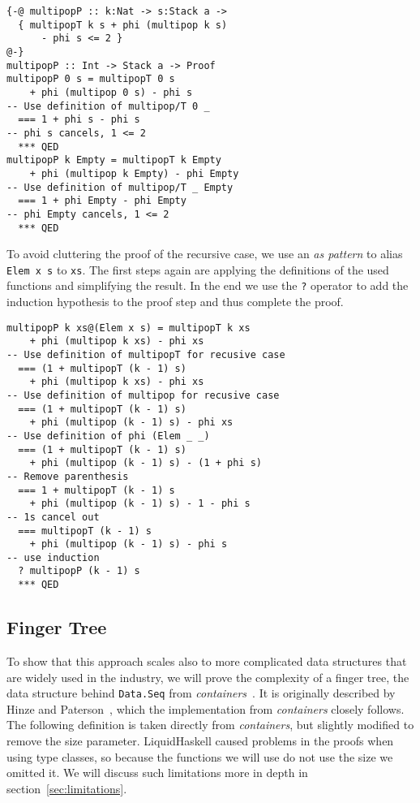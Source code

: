 \documentclass[sigplan,screen]{acmart}
\begin{document}
\begin{lstlisting}
{-@ multipopP :: k:Nat -> s:Stack a ->
  { multipopT k s + phi (multipop k s)
      - phi s <= 2 }
@-}
multipopP :: Int -> Stack a -> Proof
multipopP 0 s = multipopT 0 s
    + phi (multipop 0 s) - phi s
-- Use definition of multipop/T 0 _
  === 1 + phi s - phi s
-- phi s cancels, 1 <= 2
  *** QED
multipopP k Empty = multipopT k Empty
    + phi (multipop k Empty) - phi Empty
-- Use definition of multipop/T _ Empty
  === 1 + phi Empty - phi Empty
-- phi Empty cancels, 1 <= 2
  *** QED
\end{lstlisting}

To avoid cluttering the proof of the recursive case, we use an \textit{as pattern} to alias \texttt{Elem x s} to \texttt{xs}. The first steps again are applying the definitions of the used functions and simplifying the result. In the end we use the \texttt{?} operator to add the induction hypothesis to the proof step and thus complete the proof.

\begin{lstlisting}
multipopP k xs@(Elem x s) = multipopT k xs
    + phi (multipop k xs) - phi xs
-- Use definition of multipopT for recusive case
  === (1 + multipopT (k - 1) s)
    + phi (multipop k xs) - phi xs
-- Use definition of multipop for recusive case
  === (1 + multipopT (k - 1) s)
    + phi (multipop (k - 1) s) - phi xs
-- Use definition of phi (Elem _ _)
  === (1 + multipopT (k - 1) s)
    + phi (multipop (k - 1) s) - (1 + phi s)
-- Remove parenthesis
  === 1 + multipopT (k - 1) s
    + phi (multipop (k - 1) s) - 1 - phi s
-- 1s cancel out
  === multipopT (k - 1) s
    + phi (multipop (k - 1) s) - phi s
-- use induction
  ? multipopP (k - 1) s
  *** QED
\end{lstlisting}

\subsection{Finger Tree}

To show that this approach scales also to more complicated data structures that are widely used in the industry, we will prove the complexity of a finger tree, the data structure behind \texttt{Data.Seq} from \textit{containers}~\cite{containers}. It is originally described by Hinze and Paterson~\cite{fingertrees}, which the implementation from \textit{containers} closely follows. The following definition is taken directly from \textit{containers}, but slightly modified to remove the size parameter. LiquidHaskell caused problems in the proofs when using type classes, so because the functions we will use do not use the size we omitted it. We will discuss such limitations more in depth in section~\ref{sec:limitations}.
\end{document}
